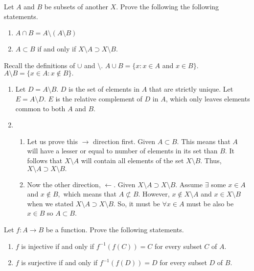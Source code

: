 \documentclass[12pt,letterpaper,boxed]{hmcpset}
\begin{document}

\begin{problem}[Exercise 1.7.]
Let $A$ and $B$ be subsets of another $X$. Prove the following the following statements. 
\vspace{-2mm}
\begin{enumerate}
	\itemsep0em
	\item $A \cap B = A \setminus(A\setminus B)$
	\item $A \subset B$ if and only if $X\setminus A \supset X\setminus B.$
\end{enumerate}
\end{problem}


\begin{solution}
Recall the definitions of $\cup$ and $\setminus$. $ A \cup B = \{x: x \in A$ and $x \in B\}$. $A\setminus B = \{ x \in A: x \notin B\}.$

\begin{enumerate}
	\itemsep0em
\item Let $D = A \setminus B.$ $D$ is the set of elements in $A$ that are strictly unique. Let $E = A \setminus D.$ $E$ is the relative complement of $D$ in $A$, which only leaves elements common to both $A$ and $B$. 
\item 

\begin{enumerate}
	\itemsep0em
	\item Let us prove this $\rightarrow$ direction first. Given $A \subset B.$ This means that $A$ will have a lesser or equal to number of elements in its set than $B.$ It follows that $X\setminus A$ will contain all elements of the set $X\setminus B.$ Thus, $X\setminus A \supset X\setminus B.$ 
	\item Now the other direction, $\leftarrow$. Given $X\setminus A \supset X\setminus B.$ Assume $\exists$ some $x \in A$ and $x \notin B,$ which means that $A \not\subset B$. However, $x \notin X\setminus A$ and $x \in X\setminus B$ when we stated $X\setminus A \supset X\setminus B.$ So, it must be $\forall x \in A$ must be also be $x \in B$ so $A \subset B$.
\end{enumerate}
\end{enumerate}
\end{solution}

\begin{problem}[Exercise 3.3.]
Let $f: A \rightarrow B$ be a function. Prove the following statements.
\vspace{-2mm}
\begin{enumerate}
	\itemsep0em
	\item $f$ is injective if and only if $f^{-1}(f(C)) = C$ for every subset $C$ of $A$.
	\item $f$ is surjective if and only if $f^{-1}(f(D)) = D$ for every subset $D$ of $B$.
\end{enumerate}
\end{problem}
\end{document}
